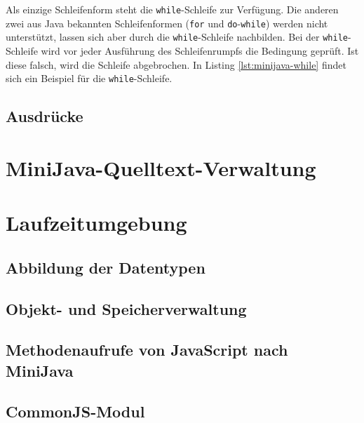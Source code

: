 

Als einzige Schleifenform steht die \lstinline{while}-Schleife zur Verfügung. Die anderen zwei aus Java bekannten Schleifenformen (\lstinline{for} und \lstinline{do}-\lstinline{while}) werden nicht unterstützt, lassen sich aber durch die \lstinline{while}-Schleife nachbilden. Bei der \lstinline{while}-Schleife wird vor jeder Ausführung des Schleifenrumpfs die Bedingung geprüft. Ist diese falsch, wird die Schleife abgebrochen. In Listing \ref{lst:minijava-while} findet sich ein Beispiel für die \lstinline{while}-Schleife.



\subsection{Ausdrücke}

\section{MiniJava-Quelltext-Verwaltung}

\section{Laufzeitumgebung}
\subsection{Abbildung der Datentypen}
\subsection{Objekt- und Speicherverwaltung}
\subsection{Methodenaufrufe von JavaScript nach MiniJava}
\subsection{CommonJS-Modul}
